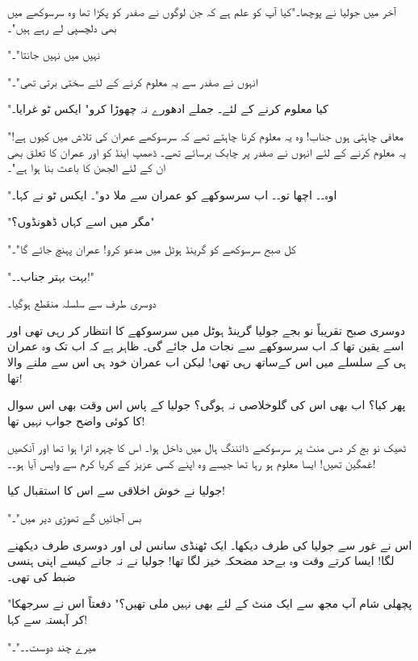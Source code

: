 آخر میں جولیا نے پوچھا۔"کیا آپ کو علم ہے کہ جن لوگوں نے صفدر کو پکڑا تھا وہ سرسوکھے میں بھی دلچسپی لے رہے ہیں"۔

"نہیں میں نہیں جانتا"۔

"انہوں نے صفدر سے یہ معلوم کرنے کے لئے سختی برتی تھی"۔

"کیا معلوم کرنے کے لئے۔ جملے ادھورے نہ چھوڑا کرو" ایکس ٹو غرایا۔

"معافی چاہتی ہوں جناب! وہ یہ معلوم کرنا چاہتے تھے کہ سرسوکھے عمران کی تلاش میں کیوں ہے! یہ معلوم کرنے کے لئے انہوں نے صفدر پر چابک برسائے تھے۔ ڈھمپ اینڈ کو اور عمران کا تعلق بھی ان کے لئے الجھن کا باعث بنا ہوا ہے"۔

"اوہ۔۔ اچھا تو۔۔ اب سرسوکھے کو عمران سے ملا دو"۔ ایکس ٹو نے کہا۔

"مگر میں اسے کہاں ڈھونڈوں؟"

"کل صبح سرسوکھے کو گرینڈ ہوٹل میں مدعو کرو! عمران پہنچ جائے گا"۔

"بہت بہتر جناب۔۔!"

دوسری طرف سے سلسلہ منقطع ہوگیا۔





\endR

\bigskip\bigskip\bigskip

\centerline{}
\bigskip\bigskip\bigskip
\beginR
\body



دوسری صبح تقریباً نو بجے جولیا گرینڈ ہوٹل میں سرسوکھے کا انتظار کر رہی تھی اور اسے یقین تھا کہ اب سرسوکھے سے نجات مل جائے گی۔ ظاہر ہے کہ اب تک وہ عمران ہی کے سلسلے میں اس کےساتھ رہی تھی! لیکن اب عمران خود ہی اس سے ملنے والا تھا!

پھر کیا؟ اب بھی اس کی گلوخلاصی نہ ہوگی؟ جولیا کے پاس اس وقت بھی اس سوال کا کوئی واضح جواب نہیں تھا!

ٹھیک نو بج کر دس منٹ پر سرسوکھے ڈائننگ ہال میں داخل ہوا۔ اس کا چہرہ اترا ہوا تھا اور آنکھیں غمگین تھیں! ایسا معلوم ہو رہا تھا جیسے وہ اپنے کسی عزیز کے کریا کرم سے واپس آیا ہو۔۔!

جولیا نے خوش اخلاقی سے اس کا استقبال کیا!

"بس آجائیں گے تھوڑی دیر میں"۔

اس نے غور سے جولیا کی طرف دیکھا۔ ایک ٹھنڈی سانس لی اور دوسری طرف دیکھنے لگا! ایسا کرتے وقت وہ بےحد مضحکہ خیز لگا تھا! جولیا نے نہ جانے کیسے اپنی ہنسی ضبط کی تھی۔

"پچھلی شام آپ مجھ سے ایک منٹ کے لئے بھی نہیں ملی تھیں؟" دفعتاً اس نے سرجھکا کر آہستہ سے کہا!

"میرے چند دوست۔۔"۔

